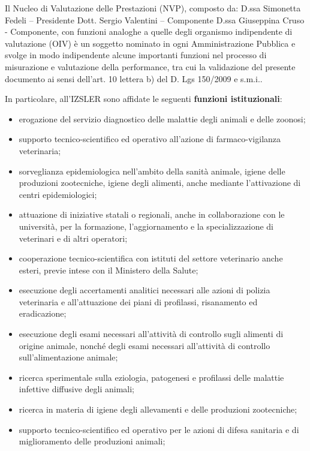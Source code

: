 \documentclass[
  12pt,
]{article}
\providecommand{\tightlist}{%
  \setlength{\itemsep}{0pt}\setlength{\parskip}{0pt}}
\begin{document}
Il Nucleo di Valutazione delle Prestazioni (NVP), composto da: D.ssa
Simonetta Fedeli -- Presidente Dott. Sergio Valentini -- Componente
D.ssa Giuseppina Cruso - Componente, con funzioni analoghe a quelle
degli organismo indipendente di valutazione (OIV) è un soggetto nominato
in ogni Amministrazione Pubblica e svolge in modo indipendente alcune
importanti funzioni nel processo di misurazione e valutazione della
performance, tra cui la validazione del presente documento ai sensi
dell'art. 10 lettera b) del D. Lgs 150/2009 e s.m.i..

\newpage

In particolare, all'IZSLER sono affidate le seguenti \textbf{funzioni
istituzionali}:

\begin{itemize}
\tightlist
\item
  erogazione del servizio diagnostico delle malattie degli animali e
  delle zoonosi;
\item
  supporto tecnico-scientifico ed operativo all'azione di
  farmaco-vigilanza veterinaria;
\item
  sorveglianza epidemiologica nell'ambito della sanità animale, igiene
  delle produzioni zootecniche, igiene degli alimenti, anche mediante
  l'attivazione di centri epidemiologici;
\item
  attuazione di iniziative statali o regionali, anche in collaborazione
  con le università, per la formazione, l'aggiornamento e la
  specializzazione di veterinari e di altri operatori;
\item
  cooperazione tecnico-scientifica con istituti del settore veterinario
  anche esteri, previe intese con il Ministero della Salute;
\item
  esecuzione degli accertamenti analitici necessari alle azioni di
  polizia veterinaria e all'attuazione dei piani di profilassi,
  risanamento ed eradicazione;
\item
  esecuzione degli esami necessari all'attività di controllo sugli
  alimenti di origine animale, nonché degli esami necessari all'attività
  di controllo sull'alimentazione animale;
\item
  ricerca sperimentale sulla eziologia, patogenesi e profilassi delle
  malattie infettive diffusive degli animali;
\item
  ricerca in materia di igiene degli allevamenti e delle produzioni
  zootecniche;
\item
  supporto tecnico-scientifico ed operativo per le azioni di difesa
  sanitaria e di miglioramento delle produzioni animali;

\end{itemize}
\end{document}
